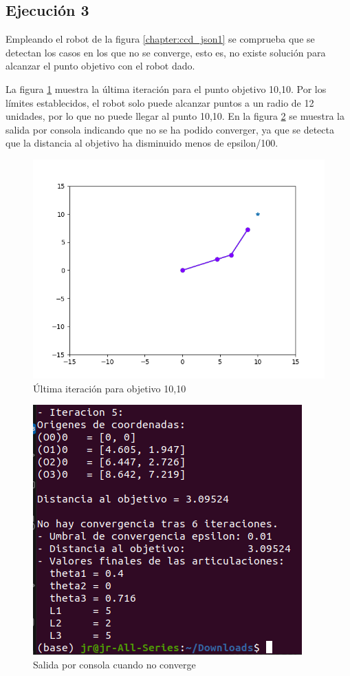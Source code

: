 \subsection{Ejecución 3}
Empleando el robot de la figura \ref{chapter:ccd_json1} se comprueba que se detectan los casos en los que no se converge, esto es, no existe solución para alcanzar el punto objetivo con el robot dado.

La figura \ref{chapter:ccd_ejemplo5} muestra la última iteración para el punto objetivo 10,10. Por los límites establecidos, el robot solo puede alcanzar puntos a un radio de 12 unidades, por lo que no puede llegar al punto 10,10.
En la figura \ref{chapter:ccd_ejemplo6} se muestra la salida por consola indicando que no se ha podido converger, ya que se detecta que la distancia al objetivo ha disminuido menos de epsilon/100.
\begin{figure}[htb]
   \centering
   \includegraphics[width=.8\linewidth]{images/ccd_10.png}
   \caption{Última iteración para objetivo 10,10}
   \label{chapter:ccd_ejemplo5}
\end{figure}
\begin{figure}[htb]
   \centering
   \includegraphics[width=.6\linewidth]{images/ccd_11.png}
   \caption{Salida por consola cuando no converge}
   \label{chapter:ccd_ejemplo6}
\end{figure}


